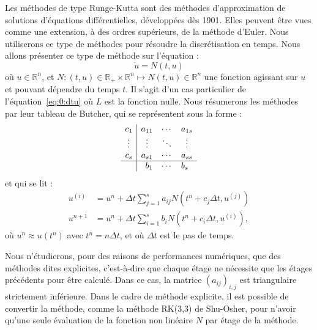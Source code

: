 Les méthodes de type Runge-Kutta sont des méthodes d'approximation de solutions d'équations différentielles, développées dès 1901. Elles peuvent être vues comme une extension, à des ordres supérieurs, de la méthode d'Euler. Nous utiliserons ce type de méthodes pour résoudre la discrétisation en temps. Nous allons présenter ce type de méthode sur l'équation :
$$
  \dot{u} = N(t,u)
$$
où $u\in\mathbb{R}^n$, et $N:(t,u)\in\mathbb{R}_+\times\mathbb{R}^n\mapsto N(t,u)\in\mathbb{R}^n$ une fonction agissant sur $u$ et pouvant dépendre du temps $t$. Il s'agit d'un cas particulier de l'équation~\eqref{eq:0:dtu} où $L$ est la fonction nulle. Nous résumerons les méthodes par leur tableau de Butcher\cite{Butcher:2008}, qui se représentent sous la forme :
\begin{equation}  
  \begin{array}{c|c}
    \begin{matrix}
      c_1 \\
      \vdots \\
      c_s
    \end{matrix}
    &
    \begin{matrix}
      a_{11} & \cdots & a_{1s} \\
      \vdots & \ddots & \vdots \\
      a_{s1} & \cdots & a_{ss}
    \end{matrix} \\
    \hline
     & \begin{matrix} b_1 & \cdots & b_s \end{matrix} \\
  \end{array}
  \label{eq:0:butcher}
\end{equation}
et qui se lit :
$$
  \begin{aligned}
    u^{(i)} &= u^n + \Delta t \sum_{j=1}^s a_{ij} N(t^n+c_j\Delta t,u^{(j)}) \\
    u^{n+1} &= u^n + \Delta t \sum_{i=1}^s b_i N(t^n+c_i\Delta t, u^{(i)}),
  \end{aligned}
$$
où $u^n\approx u(t^n)$ avec $t^n=n\Delta t$, et où $\Delta t$ est le pas de temps.

Nous n’étudierons, pour des raisons de performances numériques, que des méthodes dites explicites, c'est-à-dire que chaque étage ne nécessite que les étages précédents pour être calculé. Dans ce cas, la matrice $(a_{ij})_{i,j}$ est triangulaire strictement inférieure. Dans le cadre de méthode explicite, il est possible de convertir la méthode, comme la méthode RK(3,3) de Shu-Osher, pour n'avoir qu'une seule évaluation de la fonction non linéaire $N$ par étage de la méthode.

